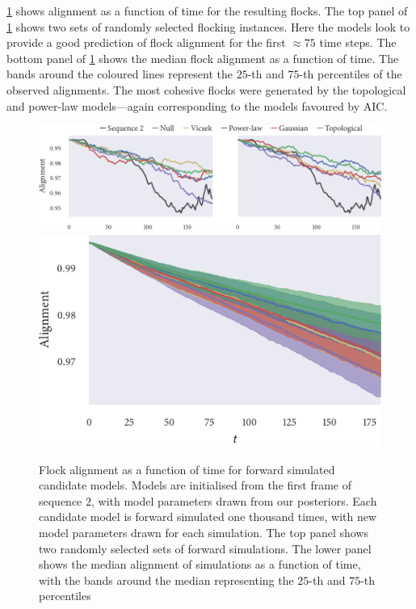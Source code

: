 \cref{fig:checks_seq2} shows alignment as a function of time for the resulting
flocks. The top panel of \cref{fig:checks_seq2} shows two sets of randomly
selected flocking instances. Here the models look to provide a good prediction 
of flock alignment for the first $\approx75$ time steps. The bottom panel of
\cref{fig:checks_seq2} shows the median flock alignment as a function of time.
The bands around the coloured lines represent the $25$-th and $75$-th
percentiles of the observed alignments. The most cohesive flocks were generated
by the topological and power-law models---again corresponding to the models
favoured by AIC.

\begin{figure}[tbp]
  \includegraphics{alignment/alignment_single_2.pdf}\vspace{1em}\\
  \includegraphics{alignment/alignment_ensemble_2.pdf}
  \caption{Flock alignment as a function of time for forward simulated
    candidate models. Models are initialised from the first frame of sequence
    $2$, with model parameters drawn from our posteriors. Each candidate
    model is forward simulated one thousand times, with new model parameters
    drawn for each simulation. The top panel shows two randomly selected sets
    of forward simulations. The lower panel shows the median alignment of
    simulations as a function of time, with the bands around the median
    representing the $25$-th and $75$-th percentiles}
  \label{fig:checks_seq2}
\end{figure}

